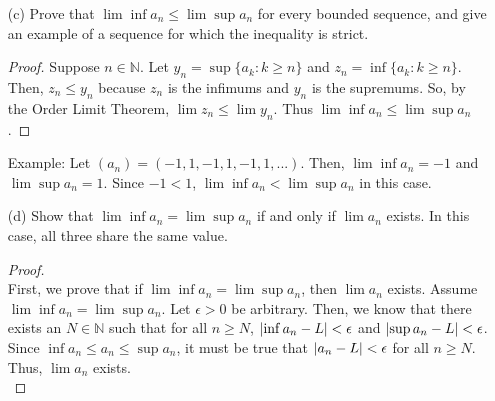 \documentclass[12pt,letterpaper]{article}
\begin{document}
\begin{itemize}[leftmargin=!,labelindent=5pt]
\begin{itemize}
                \ \ \ \ $\lim \inf a_n = z_n$ where $z_n = \inf\{a_k : k \geq n\}$.
                It always exists for any bounded sequence because of the Monotone Convergence Theorem.
                We can apply it here because we know $(z_n)$ is bounded which can be shown by applying similar logic to the proof above, namely that $(a_n)$ is bounded.
                We also know that $(z_n)$ is increasing by applying similar logic to the proof above, namely that $\{a_k : k \geq n+1\} \subseteq \{a_k : k \geq n\}$ where $n \in \bbN$ and since we are taking infinums of the smaller set, then it must hold true that $z_{n+1} \geq z_n$.
                So, since it is both bounded and monotone, we apply the Monotone Convergence Theorem to show it converges.
            \item [(c)] Prove that $\lim \inf a_n \leq \lim \sup a_n$ for every bounded sequence, and give an example of a sequence for which the inequality is strict.
                \begin{proof}
                    Suppose $n \in \mathbb{N}$. 
                    Let $y_n = \sup\{a_k : k \geq n\}$ and $z_n = \inf\{a_k : k \geq n\}$.
                    Then, $z_n \leq y_n$ because $z_n$ is the infimums and $y_n$ is the supremums.
                    So, by the Order Limit Theorem, $\lim z_n \leq \lim y_n$.
                    Thus $\lim \inf a_n \leq \lim \sup a_n$.
                \end{proof}
                
                Example: Let $(a_n) = (-1,1,-1,1,-1,1,...)$. Then, $\lim \inf a_n = -1$ and $\lim \sup a_n = 1$.
                Since $-1<1$, $\lim \inf a_n < \lim \sup a_n$ in this case.
            \item [(d)] Show that $\lim \inf a_n = \lim \sup a_n$ if and only if $\lim a_n$ exists. In this case, all three share the same value.
                \begin{proof}
                    \ \\
                    First, we prove that if $\lim \inf a_n = \lim \sup a_n$, then $\lim a_n$ exists.
                    Assume $\lim \inf a_n = \lim \sup a_n$. Let $\epsilon > 0$ be arbitrary.
                    Then, we know that there exists an $N \in \mathbb{N}$ such that for all $n \geq N$, $\abs{ \inf a_n - L } < \epsilon$ and $\abs{ \sup a_n - L } < \epsilon$.
                    Since $\inf a_n \leq a_n \leq \sup a_n$, it must be true that $\abs{a_n - L } < \epsilon$ for all $n \geq N$.
                    Thus, $\lim a_n$ exists.
                    \ \\


\end{proof}
\end{itemize}
\end{itemize}
\end{document}
